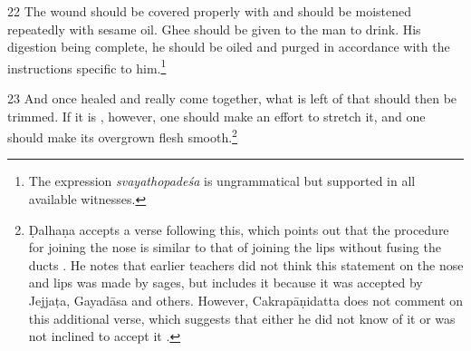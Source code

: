 \begin{translation}
    \item[22] 
    The wound should be covered properly with  and should be
    moistened repeatedly with sesame oil.  Ghee should be given to the man to
    drink.  His digestion being complete, he should be oiled and purged in
    accordance with the instructions specific to him.\footnote{The expression 
    \emph{svayathopadeśa} is ungrammatical but supported in all available 
    witnesses.}   
    
    \item[23] %
    And once healed and really come together, what is left of that 
    should then be trimmed. If it is  , however, one should make an
    effort to stretch it, and one should make its overgrown flesh 
    smooth.\footnote{Ḍalhaṇa  accepts a verse following this, which points out that 
    the procedure for joining the nose is similar to that of joining the lips without 
    fusing the ducts \citep[81]{vulgate}. He notes that earlier teachers did not think 
    this statement on the nose and lips was made by sages, but includes it because 
    it was accepted by Jejjaṭa, Gayadāsa and others. However, Cakrapāṇidatta 
     does not comment on this additional verse, which 
    suggests that either he did not know of it or was not inclined to accept it 
    \citep[133]{acar-1939}.}
    
    
\end{translation}    
